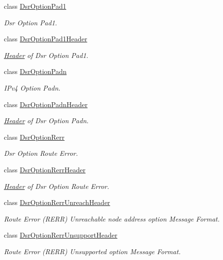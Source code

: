 \begin{DoxyCompactItemize}
class \hyperlink{classns3_1_1dsr_1_1DsrOptionPad1}{Dsr\+Option\+Pad1}
\begin{DoxyCompactList}\small\item\em Dsr Option Pad1. \end{DoxyCompactList}\item 
class \hyperlink{classns3_1_1dsr_1_1DsrOptionPad1Header}{Dsr\+Option\+Pad1\+Header}
\begin{DoxyCompactList}\small\item\em \hyperlink{classns3_1_1Header}{Header} of Dsr Option Pad1. \end{DoxyCompactList}\item 
class \hyperlink{classns3_1_1dsr_1_1DsrOptionPadn}{Dsr\+Option\+Padn}
\begin{DoxyCompactList}\small\item\em I\+Pv4 Option Padn. \end{DoxyCompactList}\item 
class \hyperlink{classns3_1_1dsr_1_1DsrOptionPadnHeader}{Dsr\+Option\+Padn\+Header}
\begin{DoxyCompactList}\small\item\em \hyperlink{classns3_1_1Header}{Header} of Dsr Option Padn. \end{DoxyCompactList}\item 
class \hyperlink{classns3_1_1dsr_1_1DsrOptionRerr}{Dsr\+Option\+Rerr}
\begin{DoxyCompactList}\small\item\em Dsr Option Route Error. \end{DoxyCompactList}\item 
class \hyperlink{classns3_1_1dsr_1_1DsrOptionRerrHeader}{Dsr\+Option\+Rerr\+Header}
\begin{DoxyCompactList}\small\item\em \hyperlink{classns3_1_1Header}{Header} of Dsr Option Route Error. \end{DoxyCompactList}\item 
class \hyperlink{classns3_1_1dsr_1_1DsrOptionRerrUnreachHeader}{Dsr\+Option\+Rerr\+Unreach\+Header}
\begin{DoxyCompactList}\small\item\em Route Error (R\+E\+RR) Unreachable node address option Message Format. \end{DoxyCompactList}\item 
class \hyperlink{classns3_1_1dsr_1_1DsrOptionRerrUnsupportHeader}{Dsr\+Option\+Rerr\+Unsupport\+Header}
\begin{DoxyCompactList}\small\item\em Route Error (R\+E\+RR) Unsupported option Message Format. \end{DoxyCompactList}\item 

\end{DoxyCompactItemize}

